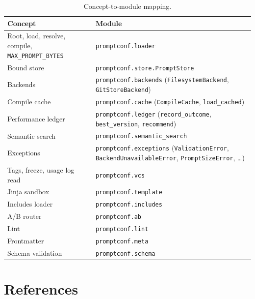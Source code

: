 \documentclass[11pt,a4paper]{article}
\newcommand{\code}[1]{\texttt{#1}}
\begin{document}
\begin{table}[htbp]
  \centering
  \begin{tabular}{@{}lp{}@{}}
    \toprule
    \textbf{Concept} & \textbf{Module} \\
    \midrule
    Root, load, resolve, compile, \code{MAX\_PROMPT\_BYTES}
      & \code{promptconf.loader} \\
    Bound store
      & \code{promptconf.store.PromptStore} \\
    Backends
      & \code{promptconf.backends}
        (\code{FilesystemBackend}, \code{GitStoreBackend}) \\
    Compile cache
      & \code{promptconf.cache}
        (\code{CompileCache}, \code{load\_cached}) \\
    Performance ledger
      & \code{promptconf.ledger}
        (\code{record\_outcome}, \code{best\_version}, \code{recommend}) \\
    Semantic search
      & \code{promptconf.semantic\_search} \\
    Exceptions
      & \code{promptconf.exceptions}
        (\code{ValidationError}, \code{BackendUnavailableError},
         \code{PromptSizeError}, \ldots) \\
    Tags, freeze, usage log read
      & \code{promptconf.vcs} \\
    Jinja sandbox
      & \code{promptconf.template} \\
    Includes loader
      & \code{promptconf.includes} \\
    A/B router
      & \code{promptconf.ab} \\
    Lint
      & \code{promptconf.lint} \\
    Frontmatter
      & \code{promptconf.meta} \\
    Schema validation
      & \code{promptconf.schema} \\
    \bottomrule
  \end{tabular}
  \caption{Concept-to-module mapping.}
  \label{tab:source-map}
\end{table}

\section{References}
\end{document}
